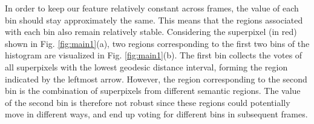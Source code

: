 \documentclass[runningheads]{llncs}
\begin{document}
In order to keep our feature relatively constant across frames, the value of each bin should stay approximately the same. This means that the regions associated with each bin also remain relatively stable. Considering the superpixel (in red) shown in Fig. \ref{fig:main1}(a), two regions corresponding to the first two bins of the histogram are visualized in Fig. \ref{fig:main1}(b). The first bin collects the votes of all superpixels with the lowest geodesic distance interval, forming the region indicated by the leftmost arrow. However, the region corresponding to the second bin is the combination of superpixels from different semantic regions. The value of the second bin is therefore not robust since these regions could potentially move in different ways, and end up voting for different bins in  subsequent frames. 
\end{document}
